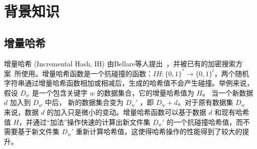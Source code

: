 


\section{背景知识}

\subsection{增量哈希}
增量哈希 (Incremental Hash, IH) 由Bellare等人提出~\cite{bellare1994incremental}，并被已有的加密搜索方案~\cite{kamara2011cs2}所使用。增量哈希函数是一个抗碰撞的函数：$IH: \{0,1\}^* \rightarrow \{0,1\}^l$，两个随机字符串通过增量哈希函数相加或相减后，生成的哈希值不会产生碰撞。举例来说，假设 $D_w$ 是一个包含关键字 $w$ 的数据集合，它的增量哈希值为 $H$。 当一个新数据 $d$ 加入到 $D_w$ 中后， 新的数据集合变为 $D_w'$ ，即 $D_w+d$。对于原有数据集 $D_w$ 来说，数据 $d$ 的加入只是微小的变动。增量哈希函数可以基于数据 $d$ 和现有哈希值 $H$，并通过“加法”操作快速的计算出新文件集 $D_w'$ 的一个抗碰撞哈希值，而不需要基于新文件集 $D_w'$ 重新计算哈希值，这使得哈希操作的性能得到了较大的提升。


